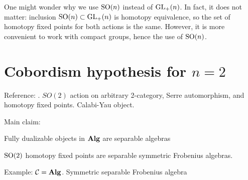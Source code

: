 \begin{remark}
  One might wonder why we use $\mathrm{SO}(n)$ instead of $\mathrm{GL}_+(n)$. In fact, it does
  not matter: inclusion $\mathrm{SO}(n)\subset \mathrm{GL}_+(n)$ is homotopy equivalence, so the
  set of homotopy fixed points for both actions is the same. However, it is more
  convenient to work with compact groups, hence the use of $\mathrm{SO}(n)$.
\end{remark}



\section{Cobordism hypothesis for $n=2$}\label{s:cobordism-hypothesis-dim2}

Reference: .
$SO(2)$ action on arbitrary 2-category, Serre automorphism, and homotopy fixed
points. Calabi-Yau object.


Main claim:

Fully dualizable objects in $\mathbf{Alg}$ are separable algebras

$\mathrm{SO}(2)$ homotopy fixed points are separable symmetric Frobenius algebras.





Example: $\mathcal{C}=\mathbf{Alg}$. Symmetric separable Frobenius algebra
